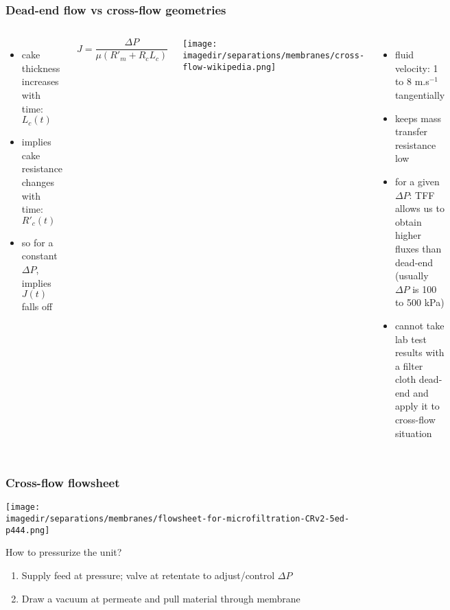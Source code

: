 \begin{frame}\frametitle{Dead-end flow vs cross-flow geometries}
	\begin{columns}[t]
			{\color{myBlue}{Dead-end flow}}
			\begin{itemize}
				\item	cake thickness increases with time: $L_c(t)$
				\item	implies cake resistance changes with time: $R'_c(t)$
				\item	so for a constant $\Delta P$, implies $J(t)$ falls off
			\end{itemize}
			\vspace{12pt}
			\begin{exampleblock}{}
					\[
						J = \displaystyle \frac{\Delta P}{\mu \left(R'_m + R_c L_c\right)} 
					\]
			\end{exampleblock}			
			{\color{myBlue}{Cross-flow (TFF)}}
			\begin{center}
				\texttt{[image: \\imagedir/separations/membranes/cross-flow-wikipedia.png]}
			\end{center}
			\vspace{-12pt}
			\begin{itemize}
				\item	fluid velocity: 1 to 8 m.s$^{-1}$ tangentially
				\item	keeps mass transfer resistance low
				\item	for a given $\Delta P$: TFF allows us to obtain higher fluxes than dead-end (usually $\Delta P$ is 100 to 500 kPa)
				\item	cannot take lab test results with a filter cloth dead-end and apply it to cross-flow situation
			\end{itemize}
	\end{columns}
\end{frame}

\begin{frame}\frametitle{Cross-flow flowsheet}
	\begin{center}
		\texttt{[image: \\imagedir/separations/membranes/flowsheet-for-microfiltration-CRv2-5ed-p444.png]}
	\end{center}
	
	\vspace{-12pt}
	How to pressurize the unit?	
	\begin{enumerate}
		\item	\small Supply feed at pressure; valve at retentate to adjust/control $\Delta P$
		\item	Draw a vacuum at permeate and pull material through membrane
	\end{enumerate}
\end{frame}

